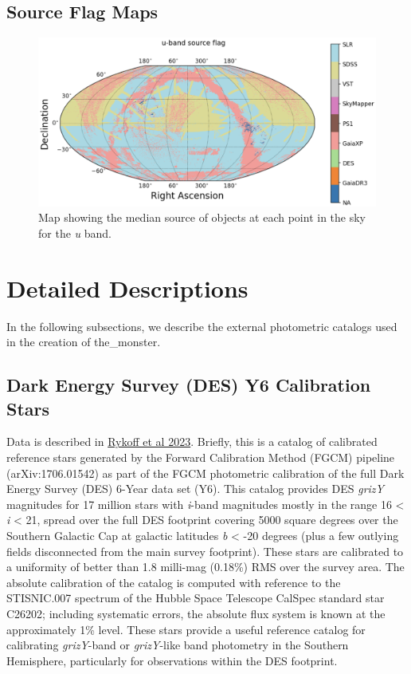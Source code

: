 \subsection{Source Flag Maps}
\begin{figure}
    \centering
    \includegraphics[width=\linewidth]{./figures/source_survey_maps/u-band_source.png}
    \caption{Map showing the median source of objects at each point in the sky for the \textit{u} band.}
    \label{source-flag-u}
\end{figure}

\section{Detailed Descriptions}
\label{sec:details}
In the following subsections, we describe the external photometric catalogs used in the creation of the\_monster.

\subsection{Dark Energy Survey (DES) Y6 Calibration Stars}
\label{sec:des}
Data is described in \href{https://arxiv.org/abs/2305.01695}{Rykoff et al 2023}. Briefly, this is a catalog of calibrated reference stars generated by the Forward Calibration Method (FGCM) pipeline (arXiv:1706.01542) as part of the FGCM photometric calibration of the full Dark Energy Survey (DES) 6-Year data set (Y6). This catalog provides DES \textit{grizY} magnitudes for 17 million stars with \textit{i}-band magnitudes mostly in the range 16 < \textit{i} < 21, spread over the full DES footprint covering 5000 square degrees over the Southern Galactic Cap at galactic latitudes \textit{b} < -20 degrees (plus a few outlying fields disconnected from the main survey footprint). These stars are calibrated to a uniformity of better than 1.8 milli-mag (0.18\%) RMS over the survey area. The absolute calibration of the catalog is computed with reference to the STISNIC.007 spectrum of the Hubble Space Telescope CalSpec standard star C26202; including systematic errors, the absolute flux system is known at the approximately 1\% level. These stars provide a useful reference catalog for calibrating \textit{grizY}-band or \textit{grizY}-like band photometry in the Southern Hemisphere, particularly for observations within the DES footprint.

